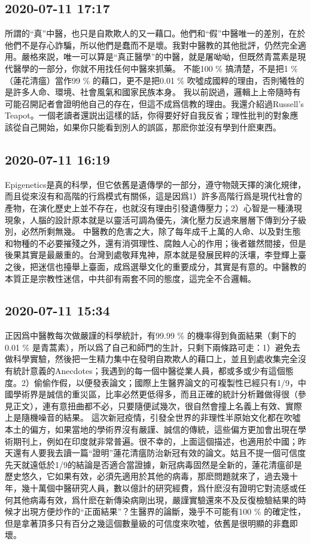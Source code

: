 \documentclass[twocolumn]{ctexart}
\begin{document}
\subsection*{2020-07-11 17:17}

所謂的“真”中醫，也只是自欺欺人的又一藉口。他們和“假”中醫唯一的差別，在於他們不是存心詐騙，所以他們是蠢而不是壞。我對中醫教的其他批評，仍然完全適用。嚴格來説，唯一可以算是“真正醫學”的中醫，就是屠呦呦，但既然青蒿素是現代醫學的一部分，你就不用找任何中醫來抓藥。
不能100 \% 搞清楚，不是把1 \% （蓮花清瘟）當作99 \% 的藉口，更不是把0.01 \% 吹噓成國粹的理由，否則犧牲的是許多人命、環境、社會風氣和國家民族本身。
我以前説過，邏輯上上帝隨時有可能召開記者會證明他自己的存在，但這不成爲信教的理由。我還介紹過Russell's Teapot。一個老讀者還説出這樣的話，你得要好好自我反省；理性批判的對象應該從自己開始，如果你只能看到別人的誤區，那麽你並沒有學到什麽東西。
\subsection*{2020-07-11 16:19}

Epigenetics是真的科學，但它依舊是遺傳學的一部分，遵守物競天擇的演化規律，而且從來沒有和高階的行爲模式有關係，這是因爲1）許多高階行爲是現代社會的產物，在演化歷史上並不存在，也就沒有理由引發遺傳壓力；2）心智是一種湧現現象，人腦的設計原本就是以靈活可調為優先，演化壓力反過來層層下傳到分子級別，必然所剩無幾。
中醫教的危害之大，除了每年成千上萬的人命、以及對生態和物種的不必要摧殘之外，還有消弭理性、腐蝕人心的作用；後者雖然間接，但是後果其實是最嚴重的。台灣到處敬拜鬼神，原本就是發展民粹的沃壤，李登輝上臺之後，把迷信也擡舉上臺面，成爲選舉文化的重要成分，其實是有意的。中醫教的本質正是宗教性迷信，中共卻有兩套不同的態度，這完全不合邏輯。
\subsection*{2020-07-11 15:34}

正因爲中醫教每次做嚴謹的科學統計，有99.99 \% 的機率得到負面結果（剩下的0.01 \% 是青蒿素），所以爲了自己和師門的生計，只剩下兩條路可走：1）避免去做科學實驗，然後把一生精力集中在發明自欺欺人的藉口上，並且到處收集完全沒有統計意義的Anecdotes；我遇到的每一個中醫從業人員，都或多或少有這個態度。2）偷偷作假，以便發表論文；國際上生醫界論文的可複製性已經只有1/9，中國學術界是誠信的重災區，比率必然更低得多，而且正確的統計分析難做得很（參見正文），連有意扭曲都不必，只要隨便試幾次，很自然會撞上名義上有效、實際上是隨機噪音的結果。
這次新冠疫情，引發全世界的非理性半原始文化都在吹噓本土的偏方，如果當地的學術界沒有嚴謹、誠信的傳統，這些偏方更加會出現在學術期刊上，例如在印度就非常普遍。很不幸的，上面這個描述，也適用於中國；昨天還有人要我去讀一篇“證明”蓮花清瘟防治新冠有效的論文。姑且不提一個可信度先天就遠低於1/9的結論是否適合當證據，新冠病毒固然是全新的，蓮花清瘟卻是歷史悠久，它如果有效，必須先適用於其他的病毒，那麽問題就來了，過去幾十年，幾十萬個中醫研究人員，數以億計的研究經費，爲什麽沒有證明它對流感或任何其他病毒有效，爲什麽在新傳染病剛出現，嚴謹實驗還來不及反復檢驗結果的時候才出現方便炒作的“正面結果”？生醫界的論斷，幾乎不可能有100 \% 的確定性，但是拿著頂多只有百分之幾這個數量級的可信度來吹噓，依舊是很明顯的非蠢即壞。
\end{document}
